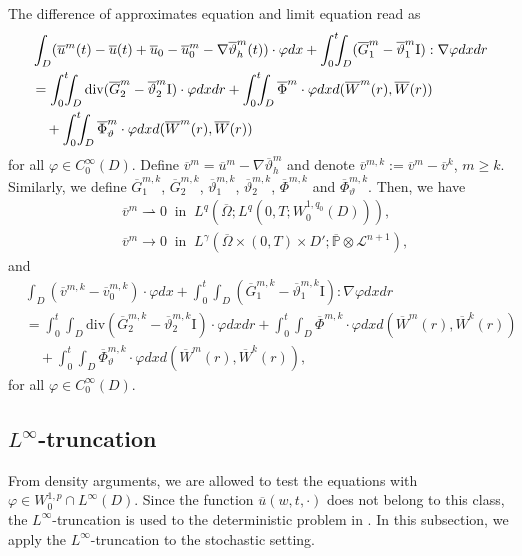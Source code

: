 \documentclass[reqno]{amsart}
\theoremstyle{definition}
\theoremstyle{remark}
\numberwithin{equation}{section} \allowdisplaybreaks
\begin{document}
The difference of approximates equation and limit equation read as
\begin{align}\label{5.51}
\notag&\int_{D}(\overline{u}^m(t)-\overline{u}(t)+\overline{u}_0-\overline{u}^m_0-\nabla
\overline{\vartheta}^m_h(t))\cdot\varphi dx+
\int_0^t\!\!\!\int_{D}(\overline{G}^m_1-\overline{\vartheta}^m_1\text{I}):\nabla\varphi dxdr\\
&=\int_0^t\!\!\!\int_{D}\text{div}(\overline{G}^m_2-\overline{\vartheta}^m_2\text{I})\cdot\varphi
dxdr+\int_0^t\!\!\!\int_{D}\overline{\Phi}^m\cdot\varphi
dxd(\overline{W}^m(r),\overline{W}(r))\\
\notag&\quad+\int_0^t\!\!\!\int_{D}\overline{\Phi}_{\vartheta}^m\cdot\varphi
dx d(\overline{W}^m(r),\overline{W}(r))
\end{align}
for all $\varphi\in C_0^\infty(D)$. Define
$\overline{v}^m=\overline{u}^m-\nabla\overline{\vartheta}_h^m$ and
denote $\overline{v}^{m,k}:=\overline{v}^m-\overline{v}^k$, $m\geq
k$. Similarly, we define $\overline{G}_1^{m,k}$,
$\overline{G}_2^{m,k}$, $\overline{\vartheta}_1^{m,k}$,
$\overline{\vartheta}_2^{m,k}$, $\overline{\Phi}^{m,k}$ and
$\overline{\Phi}_{\vartheta}^{m,k}$. Then, we have
\begin{align}\label{5.52}
&\overline{v}^m\rightharpoonup 0 ~\mbox{ in }~ L^{q}
(\overline{\Omega};L^{q}(0,T;W^{1,q_0}_0(D))),\\
\label{5.53} &\overline{v}^m\rightarrow 0 ~\mbox{ in }~
L^{\gamma}(\overline{\Omega}\times (0,T)\times
D';\overline{\mathbb{P}}\otimes\mathcal{L}^{n+1}),
\end{align}
and
\begin{equation}\label{5.54}
\begin{split}
&\int_{D}(\overline{v}^{m,k}-\overline{v}^{m,k}_0)\cdot\varphi dx+\int_0^t\!\!\!\int_{D}(\overline{G}^{m,k}_1-\overline{\vartheta}^{m,k}_1\textrm{I}):\nabla\varphi dxdr\\
&=\int_0^t\!\!\!\int_{D}\text{div}(\overline{G}^{m,k}_2-\overline{\vartheta}^{m,k}_2\textrm{I})\cdot\varphi
dxdr+\int_0^t\!\!\!\int_{D}\overline{\Phi}^{m,k}\cdot\varphi
dxd(\overline{W}^m(r),\overline{W}^k(r))\\
&\quad+\int_0^t\!\!\!\int_{D}\overline{\Phi}_{\vartheta}^{m,k}\cdot\varphi
dx d(\overline{W}^m(r),\overline{W}^k(r)),
\end{split}
\end{equation}
for all $\varphi\in C_0^\infty(D)$.

\subsection{$L^\infty$-truncation}
From density arguments, we are allowed to test the equations with
$\varphi\in W_0^{1,p}\cap L^\infty(D)$. Since the function
$\overline{u}(w,t,\cdot)$ does not belong to this class,  the
$L^\infty$-truncation {is used to} the deterministic
problem in \cite{JW}. In this subsection, we apply the
$L^\infty$-truncation to the stochastic setting.
\end{document}
